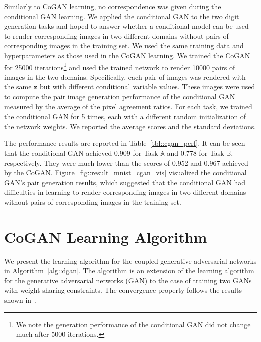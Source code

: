 \documentclass{article}
\begin{document}
Similarly to CoGAN learning, no correspondence was given during the conditional GAN learning. We applied the conditional GAN to the two digit generation tasks and hoped to answer whether a conditional model can be used to render corresponding images in two different domains without pairs of corresponding images in the training set. We used the same training data and hyperparameters as those used in the CoGAN learning. We trained the CoGAN for 25000 iterations\footnote{
We note the generation performance of the conditional GAN did not change much after 5000 iterations.} and used the trained network to render 10000 pairs of images in the two domains. Specifically, each pair of images was rendered with the same $\mathbf{z}$ but with different conditional variable values. These images were used to compute the pair image generation performance of the conditional GAN measured by the average of the pixel agreement ratios. For each task, we trained the conditional GAN for 5 times, each with a different random initialization of the network weights. We reported the average scores and the standard deviations.

The performance results are reported in Table~\ref{tbl::cgan_perf}. It can be seen that the conditional GAN achieved 0.909 for Task $\mathbb{A}$ and 0.778 for Task $\mathbb{B}$, respectively. They were much lower than the scores of 0.952 and 0.967 achieved by the CoGAN. Figure~\ref{fig::result_mnist_cgan_vis} visualized the conditional GAN's pair generation results, which suggested that the conditional GAN had difficulties in learning to render corresponding images in two different domains without pairs of corresponding images in the training set. 





\clearpage 
\section{CoGAN Learning Algorithm}\label{subsec::learning}

We present the learning algorithm for the coupled generative adversarial networks in Algorithm~\ref{alg::dgan}. The algorithm is an extension of the learning algorithm for the generative adversarial networks (GAN) to the case of training two GANs with weight sharing constraints. The convergence property follows the results shown in~\cite{goodfellow2014generative}.
\end{document}
